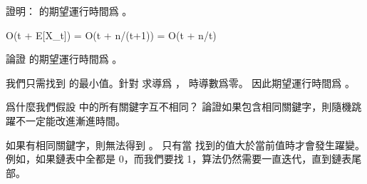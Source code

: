 \startitem
證明：  的期望運行時間爲 。
\stopitem

\startANSWER
\startformula
O(t + E[X_t]) = O(t + n/(t+1)) = O(t + n/t)
\stopformula
\stopANSWER

\startitem
論證  的期望運行時間爲 。
\stopitem

\startANSWER
我們只需找到  的最小值。針對  求導爲 ，  時導數爲零。
因此期望運行時間爲 。
\stopANSWER

\startitem
爲什麼我們假設  中的所有關鍵字互不相同？
論證如果包含相同關鍵字，則隨機跳躍不一定能改進漸進時間。
\stopitem

\startANSWER
如果有相同關鍵字，則無法得到 。
只有當  找到的值大於當前值時才會發生躍變。
例如，如果鏈表中全都是 0，而我們要找 1，算法仍然需要一直迭代，直到鏈表尾部。
\stopANSWER

\stopigBase
\stopPROBLEM

\stopsubject%
